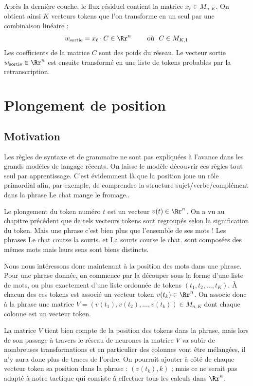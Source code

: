 \documentclass[11pt,class=report,crop=false]{standalone}
\begin{document}
Après la dernière couche, le flux résiduel contient la matrice $x_\ell \in M_{n,K}$.
On obtient ainsi $K$ vecteurs tokens que l'on transforme en un seul par une combinaison linéaire :
$$w_{\text{sortie}} = x_\ell \cdot C  \in \Rr^n \qquad \text{ où } \ C \in M_{K,1}$$
Les coefficients de la matrice $C$ sont des poids du réseau. 
Le vecteur sortie $w_{\text{sortie}} \in \Rr^n$ est ensuite transformé en une liste de tokens probables par la retranscription.


\section{Plongement de position}


\subsection{Motivation}

Les règles de syntaxe et de grammaire ne sont pas expliquées à l'avance dans les grands modèles de langage récents.
On laisse le modèle découvrir ces règles tout seul par apprentissage. C'est évidemment là que la position joue un rôle primordial afin, par exemple, de comprendre la structure sujet/verbe/complément dans la phrase \og{}Le chat mange le fromage.\fg{}.

Le plongement du token numéro $t$ est un vecteur $v(t) \in \Rr^n$.
On a vu au chapitre précédent que de tels vecteurs tokens sont regroupés selon la signification du token.
Mais une phrase c'est bien plus que l'ensemble de ses mots ! Les phrases \og{}Le chat course la souris.\fg{} et \og{}La souris course le chat.\fg{} sont composées des mêmes mots mais leurs sens sont biens distincts.


Nous nous intéressons donc maintenant à la position des mots dans une phrase.
Pour une phrase donnée, on commence par la découper sous la forme d'une liste de mots, ou plus exactement d'une liste ordonnée de tokens $(t_1,t_2,\ldots,t_K)$.
À chacun des ces tokens est associé un vecteur token $v(t_k) \in \Rr^n$. On associe donc à la phrase une matrice $V = ( v(t_1), v(t_2), \ldots, v(t_k) ) \in M_{n,K}$ dont chaque colonne est un vecteur token.



La matrice $V$ tient bien compte de la position des tokens dans la phrase, mais lors de son passage à travers le réseau de neurones la matrice $V$ va subir de nombreuses transformations et en particulier des colonnes vont être mélangées, il n'y aura donc plus de traces de l'ordre.
On pourrait ajouter à côté de chaque vecteur token sa position dans la phrase : $(v(t_k), k)$ ; mais ce ne serait pas adapté à notre tactique qui consiste à effectuer tous les calculs dans $\Rr^n$.
\end{document}
